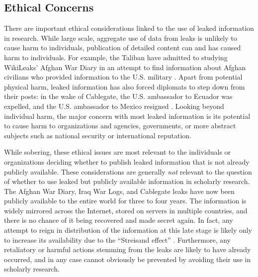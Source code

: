 \documentclass[12pt]{article}
\begin{document}
\subsection*{Ethical Concerns}

There are important ethical considerations linked to the use of leaked information in research. 
While large scale, aggregate use of data from leaks is unlikely to cause harm to individuals, 
publication of detailed content can and has 
caused harm to individuals. For example, the Taliban have admitted to studying WikiLeaks' 
Afghan War Diary in an attempt to find information about Afghan civilians who provided information 
to the U.S. military \citep{winnett2010wikileaks}. Apart from potential physical harm, 
leaked information 
has also forced diplomats to step down from their posts: in the wake of Cablegate, the 
U.S. ambassador to Ecuador was expelled, and the U.S. ambassador to Mexico 
resigned \citep{romero2011ecuador,associated_press2011us}. 
Looking beyond individual harm, the major concern with most leaked information is its potential to 
cause harm to organizations and agencies, governments, or more abstract subjects such as 
national security or international reputation.

While sobering, these ethical issues are most relevant to the individuals or organizations deciding 
whether to publish leaked 
information that is not already publicly available. These considerations are generally \emph{not} 
relevant 
to the question of whether to use leaked but publicly available information in scholarly research. 
The Afghan War Diary, Iraq 
War Logs, and Cablegate leaks have now been publicly available to the entire world for three to four 
years. The information is widely mirrored across the Internet, stored on servers in multiple countries, 
and there is no chance of it being 
recovered and made secret again. In fact, any attempt to reign in distribution of the information at this 
late stage is likely only to increase its availability due to the ``Streisand effect'' \citep{marton2010protecting}. 
Furthermore, any retaliatory or harmful actions stemming from the leaks are likely 
to have already occurred, and in any case cannot obviously be prevented by avoiding their use in scholarly 
research.
\end{document}
